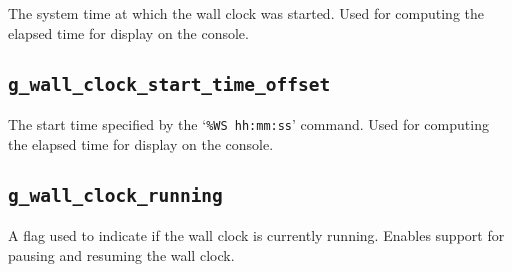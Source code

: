 \documentclass[12pt]{report}
\begin{document}
The system time at which the wall clock was started. Used for computing the elapsed time for display on the console.

\subsection{\texttt{g_wall_clock_start_time_offset}}

The start time specified by the `\texttt{\%WS hh:mm:ss}' command. Used for computing the elapsed time for display on the console.

\subsection{\texttt{g_wall_clock_running}}

A flag used to indicate if the wall clock is currently running. Enables support for pausing and resuming the wall clock.
\end{document}
